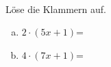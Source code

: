 \begin{aufgabe} ~ \\ 
Löse die Klammern auf.\begin{multicols}{2} 
\begin{enumerate}[a)] 
\item 
$2\cdot(5x+1)$=
\item 
$4\cdot(7x+1)$=
\end{enumerate} 
\end{multicols} 
\end{aufgabe} 
